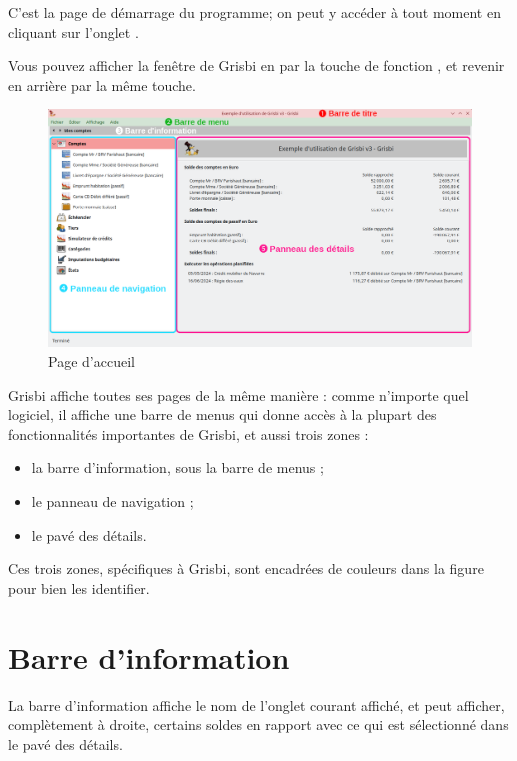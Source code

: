 C'est la page de démarrage du programme; on peut y accéder à tout moment en cliquant sur l'onglet . 

Vous pouvez afficher la fenêtre de Grisbi en  par la touche de fonction , et revenir en arrière par la même touche.


\begin{figure}[htbp]
\begin{center}
\includegraphics[scale=0.35]{image/screenshot/home}
\end{center}
\caption{Page d'accueil}
\label{home-img}
\end{figure}

Grisbi affiche toutes ses pages de la même manière : comme n'importe quel logiciel, il affiche une barre de menus qui donne accès à la plupart des fonctionnalités importantes de Grisbi, et aussi trois zones :

\begin{itemize}
	 \item la barre d'information, sous la barre de menus ;
	 \item le panneau de navigation ;
	 \item le pavé des détails.
\end{itemize}


Ces trois zones, spécifiques à Grisbi, sont encadrées de couleurs dans la figure pour bien les identifier.


\section{Barre d'information\label{home-synthesis}}


La barre d'information affiche le nom de l'onglet courant affiché, et peut afficher, complètement à droite, certains soldes en rapport avec ce qui est sélectionné dans le pavé des détails.

